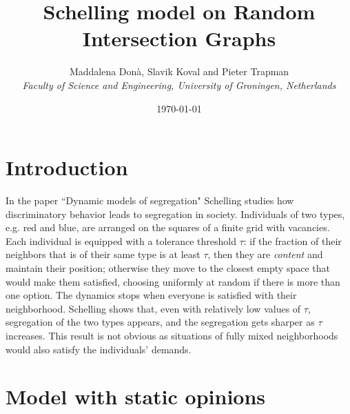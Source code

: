 \documentclass{article}
\title{Schelling model on Random Intersection Graphs}
\author{Maddalena Don{\`a}, Slavik Koval and Pieter Trapman\\
\vspace{0.5cm}
{\normalsize \it
Faculty of Science and Engineering, University of Groningen, Netherlands}
}
\date{\today}
\theoremstyle{remark}
\newtheorem*{partial proof}{Partial proof of the Conjecture}
\begin{document}
\maketitle
\begin{abstract}

\end{abstract}

\section{Introduction}
In the paper ``Dynamic models of segregation" \cite{schelling1971dynamic} Schelling studies how discriminatory behavior leads to segregation in society. Individuals of two types, e.g. red and blue, are arranged on the squares of a finite grid with vacancies. Each individual is equipped with a tolerance threshold $\tau$: if the fraction of their neighbors that is of their same type is at least $\tau$, then they are \textit{content} and maintain their position; otherwise they move to the closest empty space that would make them satisfied, choosing uniformly at random if there is more than one option. The dynamics stops when everyone is satisfied with their neighborhood. Schelling shows that, even with relatively low values of $\tau$, segregation of the two types appears, and the segregation gets sharper as $\tau$ increases. This result is not obvious as situations of fully mixed neighborhoods would also satisfy the individuals' demands.



\section{Model with static opinions}
\end{document}
